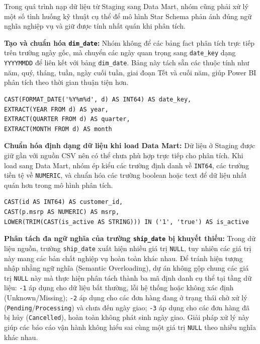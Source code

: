 \documentclass[12pt,a4paper]{article}
\newcommand{\code}[1]{\texttt{#1}}
\begin{document}
Trong quá trình nạp dữ liệu từ Staging sang Data Mart, nhóm cũng phải xử lý một số tình huống kỹ thuật cụ thể để mô hình Star Schema phản ánh đúng ngữ nghĩa nghiệp vụ và giữ được tính nhất quán khi phân tích.

\textbf{Tạo và chuẩn hóa \code{dim\_date}:} Nhóm không để các bảng fact phân tích trực tiếp trên trường ngày gốc, mà chuyển các ngày quan trọng sang \code{date\_key} dạng \code{YYYYMMDD} để liên kết với bảng \code{dim\_date}. Bảng này tách sẵn các thuộc tính như năm, quý, tháng, tuần, ngày cuối tuần, giai đoạn Tết và cuối năm, giúp Power BI phân tích theo thời gian thuận tiện hơn.

\begin{lstlisting}[style=sqlstyle]
CAST(FORMAT_DATE('%Y%m%d', d) AS INT64) AS date_key,
EXTRACT(YEAR FROM d) AS year,
EXTRACT(QUARTER FROM d) AS quarter,
EXTRACT(MONTH FROM d) AS month
\end{lstlisting}

\textbf{Chuẩn hóa định dạng dữ liệu khi load Data Mart:} Dữ liệu ở Staging được giữ gần với nguồn CSV nên có thể chưa phù hợp trực tiếp cho phân tích. Khi load sang Data Mart, nhóm ép kiểu các trường định danh về \code{INT64}, các trường tiền tệ về \code{NUMERIC}, và chuẩn hóa các trường boolean hoặc text để dữ liệu nhất quán hơn trong mô hình phân tích.

\begin{lstlisting}[style=sqlstyle]
CAST(id AS INT64) AS customer_id,
CAST(p.msrp AS NUMERIC) AS msrp,
LOWER(TRIM(CAST(is_active AS STRING))) IN ('1', 'true') AS is_active
\end{lstlisting}

\textbf{Phân tách đa ngữ nghĩa của trường \code{ship\_date} bị khuyết thiếu:} Trong dữ liệu nguồn, trường \code{ship\_date} xuất hiện nhiều giá trị \code{NULL}, tuy nhiên các giá trị này mang các bản chất nghiệp vụ hoàn toàn khác nhau. Để tránh hiện tượng nhập nhằng ngữ nghĩa (Semantic Overloading), dự án không gộp chung các giá trị \code{NULL} này mà thực hiện phân tách thành ba mã định danh cụ thể tại tầng dữ liệu: \code{-1} áp dụng cho dữ liệu bất thường, lỗi hệ thống hoặc không xác định (Unknown/Missing); \code{-2} áp dụng cho các đơn hàng đang ở trạng thái chờ xử lý (\code{Pending}/\code{Processing}) và chưa đến ngày giao; \code{-3} áp dụng cho các đơn hàng đã bị hủy (\code{Cancelled}), hoàn toàn không phát sinh ngày giao. Giải pháp xử lý này giúp các báo cáo vận hành không hiểu sai cùng một giá trị \code{NULL} theo nhiều nghĩa khác nhau.
\end{document}
